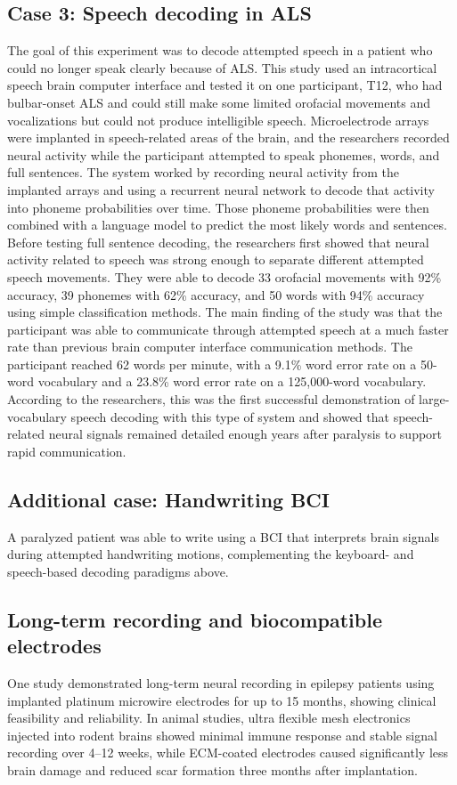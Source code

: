 \documentclass[11pt]{article}
\begin{document}
\subsection*{Case 3: Speech decoding in ALS \cite{willett2023speech}}
The goal of this experiment was to decode attempted speech in a patient who
could no longer speak clearly because of ALS. This study used an intracortical
speech brain computer interface and tested it on one participant, T12, who had
bulbar-onset ALS and could still make some limited orofacial movements and
vocalizations but could not produce intelligible speech. Microelectrode arrays
were implanted in speech-related areas of the brain, and the researchers
recorded neural activity while the participant attempted to speak phonemes,
words, and full sentences. The system worked by recording neural activity from
the implanted arrays and using a recurrent neural network to decode that
activity into phoneme probabilities over time. Those phoneme probabilities were
then combined with a language model to predict the most likely words and
sentences. Before testing full sentence decoding, the researchers first showed
that neural activity related to speech was strong enough to separate different
attempted speech movements. They were able to decode 33 orofacial movements
with 92\% accuracy, 39 phonemes with 62\% accuracy, and 50 words with 94\%
accuracy using simple classification methods. The main finding of the study was
that the participant was able to communicate through attempted speech at a much
faster rate than previous brain computer interface communication methods. The
participant reached 62 words per minute, with a 9.1\% word error rate on a
50-word vocabulary and a 23.8\% word error rate on a 125{,}000-word vocabulary.
According to the researchers, this was the first successful demonstration of
large-vocabulary speech decoding with this type of system and showed that
speech-related neural signals remained detailed enough years after paralysis to
support rapid communication.

\subsection*{Additional case: Handwriting BCI \cite{willett2021handwriting}}
A paralyzed patient was able to write using a BCI that interprets brain signals
during attempted handwriting motions, complementing the keyboard- and
speech-based decoding paradigms above.

\subsection*{Long-term recording and biocompatible electrodes \cite{gao2025biocompat}}
One study demonstrated long-term neural recording in epilepsy patients using
implanted platinum microwire electrodes for up to 15 months, showing clinical
feasibility and reliability. In animal studies, ultra flexible mesh electronics
injected into rodent brains showed minimal immune response and stable signal
recording over 4--12 weeks, while ECM-coated electrodes caused significantly
less brain damage and reduced scar formation three months after implantation.
\end{document}
